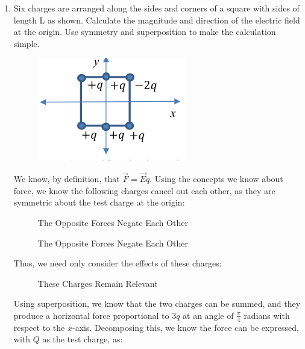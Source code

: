 \begin{enumerate}

  \item Six charges are arranged along the sides and corners of a square with sides of length L as shown. Calculate the magnitude and direction of the electric field at the origin. Use symmetry and superposition to make the calculation simple.

    \begin{center}
      \begin{figure}[H]
        \centering
        \includegraphics[width=.3\textwidth]{Figures/Figure2-1.png}
        \label{fig:1}
      \end{figure}
    \end{center}

    We know, by definition, that $\vec{F}=\vec{E}q$. Using the concepts we know about force, we know the following charges cancel out each other, as they are symmetric about the test charge at the origin:

    \begin{figure}[H]
      \centering
      
      \caption{The Opposite Forces Negate Each Other}
      \label{fig:3}
    \end{figure}

    \begin{figure}[H]
      \centering
      
      \caption{The Opposite Forces Negate Each Other}
      \label{fig:4}
    \end{figure}

    Thus, we need only consider the effects of these charges:

    \begin{figure}[H]
      \centering
      
      \caption{These Charges Remain Relevant}
      \label{fig:5}
    \end{figure}

    Using superposition, we know that the two charges can be summed, and they produce a horizontal force proportional to $3q$ at an angle of $\frac{\pi}{4}$ radians with respect to the $x$-axis. Decomposing this, we know the force can be expressed, with $Q$ as the test charge, as:


\end{enumerate}
